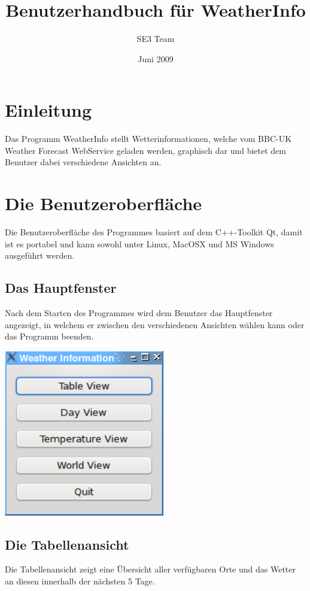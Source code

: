 \documentclass[11pt,a4paper]{scrreprt}
\begin{document}
\selectlanguage{\german}
\title{Benutzerhandbuch für WeatherInfo}
\author{SE3 Team}
\date{Juni 2009}

\maketitle

\tableofcontents

\chapter{Einleitung}
Das Programm WeatherInfo stellt Wetterinformationen, welche vom BBC-UK Weather Forecast
WebService geladen werden, graphisch dar und bietet dem Benutzer dabei verschiedene
Ansichten an.

\chapter{Die Benutzeroberfläche}
Die Benutzeroberfläche des Programmes basiert auf dem C++-Toolkit Qt, damit ist
es portabel und kann sowohl unter Linux, MacOSX und MS Windows ausgeführt werden.

\section{Das Hauptfenster}
Nach dem Starten des Programmes wird dem Benutzer das Hauptfenster angezeigt,
in welchem er zwischen den verschiedenen Ansichten wählen kann oder das
Programm beenden.

\begin{center}
\includegraphics[width=7cm]{mainwidget.png}
\end{center}

\section{Die Tabellenansicht}
Die Tabellenansicht zeigt eine Übersicht aller verfügbaren Orte und das
Wetter an diesen innerhalb der nächsten 5 Tage.
\end{document}
